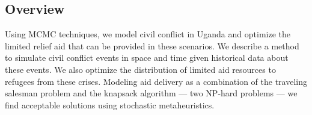 \documentclass[a0,final]{a0poster}
\begin{document}
\begin{multicols}{3}							%
\raggedcolumns							%

\section*{Overview}

\vspace{-6mm}

Using MCMC techniques, we model civil conflict in Uganda and optimize the limited relief aid that can be provided in these scenarios. We describe a method to simulate civil conflict events in space and time given historical data about these events. We also optimize the distribution of limited aid resources to refugees from these crises. Modeling aid delivery as a combination of the traveling salesman problem and the knapsack algorithm --- two NP-hard problems --- we find acceptable solutions using stochastic metaheuristics.\\

\vspace{-5mm}


\end{multicols}
\end{document}
